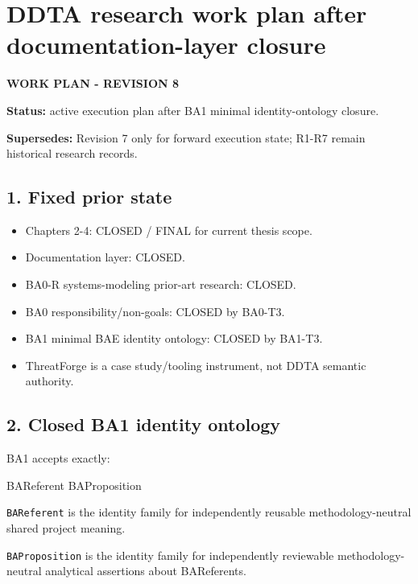 \documentclass[
  10pt,
  a4paper,
]{article}
\author{}
\date{}
\newenvironment{Shaded}{}{}
\newcommand{\NormalTok}[1]{#1}
\providecommand{\tightlist}{%
  \setlength{\itemsep}{0pt}\setlength{\parskip}{0pt}}
\begin{document}
\section{DDTA research work plan after documentation-layer
closure}\label{ddta-research-work-plan-after-documentation-layer-closure}

\textbf{WORK PLAN - REVISION 8}

\textbf{Status:} active execution plan after BA1 minimal
identity-ontology closure.

\textbf{Supersedes:} Revision 7 only for forward execution state; R1-R7
remain historical research records.

\subsection{1. Fixed prior state}\label{fixed-prior-state}

\begin{itemize}
\tightlist
\item
  Chapters 2-4: CLOSED / FINAL for current thesis scope.
\item
  Documentation layer: CLOSED.
\item
  BA0-R systems-modeling prior-art research: CLOSED.
\item
  BA0 responsibility/non-goals: CLOSED by BA0-T3.
\item
  BA1 minimal BAE identity ontology: CLOSED by BA1-T3.
\item
  ThreatForge is a case study/tooling instrument, not DDTA semantic
  authority.
\end{itemize}

\subsection{2. Closed BA1 identity
ontology}\label{closed-ba1-identity-ontology}

BA1 accepts exactly:

\begin{Shaded}
\begin{Highlighting}[]
\NormalTok{BAReferent}
\NormalTok{BAProposition}
\end{Highlighting}
\end{Shaded}

\texttt{BAReferent} is the identity family for independently reusable
methodology-neutral shared project meaning.

\texttt{BAProposition} is the identity family for independently
reviewable methodology-neutral analytical assertions about BAReferents.
\end{document}
